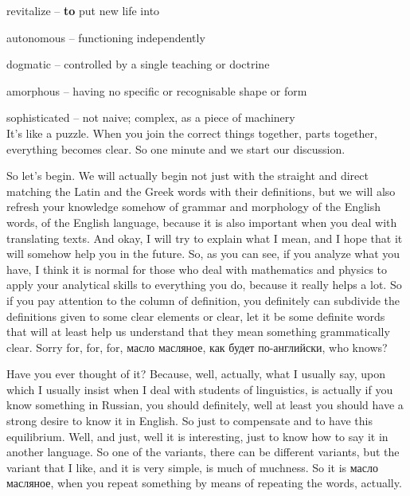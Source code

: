 \documentclass[main.tex]{subfiles}
\begin{document}
revitalize -- \textbf{to} put new life into

autonomous -- functioning independently

dogmatic -- controlled by a single teaching or doctrine

amorphous -- having no specific or recognisable shape or form

sophisticated -- not naive; complex, as a piece of machinery
\\

It's like a puzzle.
When you join the correct things together, parts together, everything becomes clear.
So one minute and we start our discussion.

So let's begin.
We will actually begin not just with the straight and direct matching the Latin and the Greek words with their definitions, but we will also refresh your knowledge somehow of grammar and morphology of the English words, of the English language, because it is also important when you deal with translating texts.
And okay, I will try to explain what I mean, and I hope that it will somehow help you in the future.
So, as you can see, if you analyze what you have, I think it is normal for those who deal with mathematics and physics to apply your analytical skills to everything you do, because it really helps a lot.
So if you pay attention to the column of definition, you definitely can subdivide the definitions given to some clear elements or clear, let it be some definite words that will at least help us understand that they mean something grammatically clear.
Sorry for, for, for, масло масляное, как будет по-английски, who knows?

Have you ever thought of it?
Because, well, actually, what I usually say, upon which I usually insist when I deal with students of linguistics, is actually if you know something in Russian, you should definitely, well at least you should have a strong desire to know it in English.
So just to compensate and to have this equilibrium.
Well, and just, well it is interesting, just to know how to say it in another language.
So one of the variants, there can be different variants, but the variant that I like, and it is very simple, is much of muchness.
So it is масло масляное, when you repeat something by means of repeating the words, actually.
\end{document}
